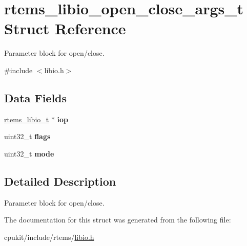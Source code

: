 \hypertarget{structrtems__libio__open__close__args__t}{}\section{rtems\+\_\+libio\+\_\+open\+\_\+close\+\_\+args\+\_\+t Struct Reference}
\label{structrtems__libio__open__close__args__t}


Parameter block for open/close.  




{\ttfamily \#include $<$libio.\+h$>$}

\subsection*{Data Fields}
\begin{DoxyCompactItemize}
\item 
\mbox{\label{structrtems__libio__open__close__args__t_a2acd0d240452ff093b579d4e4ea99b1c}} 
\mbox{\hyperlink{structrtems__libio__tt}{rtems\+\_\+libio\+\_\+t}} $\ast$ {\bfseries iop}
\item 
\mbox{\label{structrtems__libio__open__close__args__t_a526f5747284cd7dd878ac309d09010ad}} 
uint32\+\_\+t {\bfseries flags}
\item 
\mbox{\label{structrtems__libio__open__close__args__t_a07cdc68cacc37fbb100601ee8b7a23d6}} 
uint32\+\_\+t {\bfseries mode}
\end{DoxyCompactItemize}


\subsection{Detailed Description}
Parameter block for open/close. 

The documentation for this struct was generated from the following file\+:\begin{DoxyCompactItemize}
\item 
cpukit/include/rtems/\mbox{\hyperlink{libio_8h}{libio.\+h}}\end{DoxyCompactItemize}
